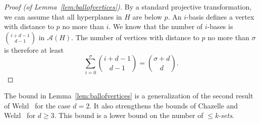 \documentclass[preprint, 12pt]{elsarticle}
\begin{document}
\begin{proof}[Proof (of Lemma~\ref{lem:ballofvertices})]
By a standard projective transformation, we can assume that all hyperplanes in $H$ are below $p$. An $i$-basis defines a vertex with distance to $p$ no more than $i$. We know that the number of $i$-bases is $\binom{i+d-1}{d-1}$ in $\mathcal{A}(H)$. The number of vertices with distance to $p$ no more than $\sigma$ is therefore at least
\[ \sum_{i=0}^{\sigma}\binom{i+d-1}{d-1} = \binom{\sigma+d}{d} .\]
\end{proof}

The bound in Lemma~\ref{lem:ballofvertices} is a generalization of the second result of Welzl~\cite{welzl92} for the case $d = 2$. It also strengthens the bounds of Chazelle and Welzl~\cite{Chazelle89} for $d\ge 3$. This bound is a lower bound on the number of \emph{$\leq$k-sets}.

\end{document}
